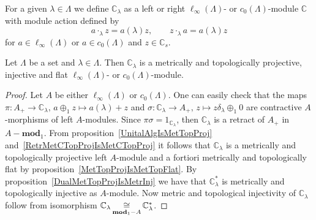 For a given $\lambda\in\Lambda$ we define $\mathbb{C}_\lambda$ as a left or right
$\ell_\infty(\Lambda)$- or $c_0(\Lambda)$-module $\mathbb{C}$ with module action
defined by
$$
a\cdot_\lambda z=a(\lambda)z,\qquad z\cdot_\lambda a=a(\lambda) z
$$
for $a\in \ell_\infty(\Lambda)$ or $a\in c_0(\Lambda)$ and $z\in\mathbb{C}_s$. 

\begin{proposition}\label{OneDimlInftyc0ModMetTopProjIngFlat} Let $\Lambda$ be a
set and $\lambda\in\Lambda$. Then $\mathbb{C}_\lambda$ is a metrically and
topologically projective, injective and flat $\ell_\infty(\Lambda)$- or
$c_0(\Lambda)$-module.
\end{proposition}
\begin{proof} Let $A$ be either $\ell_\infty(\Lambda)$ or $c_0(\Lambda)$. One
can easily check that the 
maps $\pi:A_+\to\mathbb{C}_\lambda,\, a\oplus_1 z\mapsto a(\lambda)+z$ 
and $\sigma:\mathbb{C}_\lambda\to A_+,\, z\mapsto z\delta_\lambda\oplus_1 0$ 
are contractive $A$-morphisms of left $A$-modules.
Since $\pi\sigma=1_{\mathbb{C}_\lambda}$, then $\mathbb{C}_\lambda$ is a retract
of $A_+$ in $A-\mathbf{mod}_1$. From proposition~\ref{UnitalAlgIsMetTopProj}
and~\ref{RetrMetCTopProjIsMetCTopProj} it follows that $\mathbb{C}_\lambda$ is a 
metrically and topologically projective left $A$-module and a fortiori
metrically and topologically flat by proposition~\ref{MetTopProjIsMetTopFlat}.
By proposition~\ref{DualMetTopProjIsMetrInj} we have that $\mathbb{C}_\lambda^*$
is metrically and topologically injective as $A$-module. Now metric and
topological injectivity of $\mathbb{C}_\lambda$ follow from isomorphism
$\mathbb{C}_\lambda\mathop{\mathbin{\cong}}\limits_{\mathbf{mod}_1-A}\mathbb{C}_\lambda^*$.
\end{proof}

